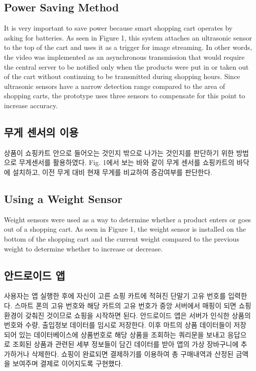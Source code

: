 \documentclass[smallextended]{svjour3}       %
\begin{document}
\hypertarget{power-saving-method}{%
\subsection{Power Saving Method}\label{power-saving-method}}

It is very important to save power because smart shopping cart operates
by asking for batteries. As seen in Figure 1, this system attaches an
ultrasonic sensor to the top of the cart and uses it as a trigger for
image streaming. In other words, the video was implemented as an
asynchronous transmission that would require the central server to be
notified only when the products were put in or taken out of the cart
without continuing to be transmitted during shopping hours. Since
ultrasonic sensors have a narrow detection range compared to the area of
shopping carts, the prototype uses three sensors to compensate for this
point to increase accuracy.

\hypertarget{uxbb34uxac8c-uxc13cuxc11cuxc758-uxc774uxc6a9}{%
\subsection{무게 센서의
이용}\label{uxbb34uxac8c-uxc13cuxc11cuxc758-uxc774uxc6a9}}

상품이 쇼핑카트 안으로 들어오는 것인지 밖으로 나가는 것인지를 판단하기
위한 방법으로 무게센서를 활용하였다. Fig. 1에서 보는 바와 같이 무게
센서를 쇼핑카트의 바닥에 설치하고, 이전 무게 대비 현재 무게를 비교하여
증감여부를 판단한다.

\hypertarget{using-a-weight-sensor}{%
\subsection{Using a Weight Sensor}\label{using-a-weight-sensor}}

Weight sensors were used as a way to determine whether a product enters
or goes out of a shopping cart. As seen in Figure 1, the weight sensor
is installed on the bottom of the shopping cart and the current weight
compared to the previous weight to determine whether to increase or
decrease.

\hypertarget{uxc548uxb4dcuxb85cuxc774uxb4dc-uxc571}{%
\subsection{안드로이드 앱}\label{uxc548uxb4dcuxb85cuxc774uxb4dc-uxc571}}

사용자는 앱 실행한 후에 자신이 고른 쇼핑 카트에 적혀진 단말기 고유
번호를 입력한다. 스마트 폰의 고유 번호와 해당 카트의 고유 번호가 중앙
서버에서 매핑이 되면 쇼핑 환경이 갖춰진 것이므로 쇼핑을 시작하면 된다.
안드로이드 앱은 서버가 인식한 상품의 번호와 수량, 출입정보 데이터를
임시로 저장한다. 이후 마트의 상품 데이터들이 저장되어 있는
데이터베이스에 상품번호로 해당 상품을 조회하는 쿼리문을 보내고 응답으로
조회된 상품과 관련된 세부 정보들이 담긴 데이터를 받아 앱의 가상
장바구니에 추가하거나 삭제한다. 쇼핑이 완료되면 결제하기를 이용하여 총
구매내역과 산정된 금액을 보여주며 결제로 이어지도록 구현했다.
\end{document}
